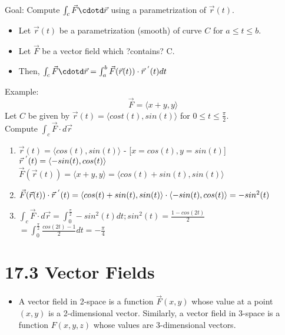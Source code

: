 \documentclass[12pt,letterpaper, onecolumn]{exam}
\begin{document}
		Goal: Compute $\int_c \vec{F}\cdotd\vec{r}$ using a parametrization of $\vec{r}(t)$.\\
		\begin{itemize}
			\item Let $\vec{r}(t)$ be a parametrization (smooth) of curve $C$ for $a\leq t \leq b$.
			\item Let $\vec{F}$ be a vector field which ?contains? C.
			\item Then, $\int_c \vec{F}\cdotd\vec{r}=\int_{a}^{b}\vec{F}(\vec{r}(t))\cdot\vec{r}^{\hspace*{0.1cm}'}(t) dt$
		\end{itemize}
		Example:\\
		$$\vec{F}=\langle x+y,y\rangle$$
		Let $C$ be given by $\vec{r}(t)=\langle cost(t), sin(t)\rangle$ for $0\leq t \leq \frac{\pi}{2}$. \\
		Compute $\int_c \vec{F}\cdot d\vec{r}$
		\begin{enumerate}
			\item $\vec{r}(t)=\langle cos(t),sin(t) \rangle$ - [$x=cos(t),y=sin(t)$]\\
			$\vec{r}^{\hspace*{0.1cm}'}(t)=\langle -sin(t),cos(t) \rangle$\\
			$\vec{F}(\vec{r}(t))=\langle x+y, y \rangle=\langle cos(t)+sin(t),sin(t) \rangle$
			\item $\vec{F}(\vec{r}(t))\cdot\vec{r}^{\hspace*{0.1cm}'}(t)=\langle cos(t)+sin(t),sin(t) \rangle \cdot \langle-sin(t), cos(t)\rangle = -sin^2(t)$
			\item $\int_c \vec{F}\cdot d\vec{r}=\int _{0}^{\frac{\pi}{2}}-sin^2(t) dt; sin^2(t)=\frac{1-cos(2t)}{2}$\\
			$=\int_{0}^{\frac{\pi}{2}}\frac{cos(2t)-1}{2}dt=-\frac{\pi}{4}$
		\end{enumerate}
		\section*{17.3 Vector Fields}
		\begin{itemize}
			\item A vector field in 2-space is a function $\vec{F}(x,y)$ whose value at a point $(x,y)$ is a 2-dimensional vector. Similarly, a vector field in 3-space is a function $F(x,y,z)$ whose values are 3-dimensional vectors.
		\end{itemize}
\end{document}
